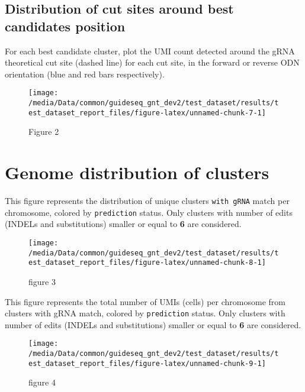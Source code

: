 \documentclass[
]{article}
\begin{document}
\subsection{Distribution of cut sites around best candidates
position}\label{distribution-of-cut-sites-around-best-candidates-position}

For each best candidate cluster, plot the UMI count detected around the
gRNA theoretical cut site (dashed line) for each cut site, in the
forward or reverse ODN orientation (blue and red bars respectively).

\begin{figure}[H]

{\centering \texttt{[image: /media/Data/common/guideseq\_gnt\_dev2/test\_dataset/results/test\_dataset\_report\_files/figure-latex/unnamed-chunk-7-1]} 

}

\caption{Figure 2}\label{fig:unnamed-chunk-7}
\end{figure}

\section{Genome distribution of
clusters}\label{genome-distribution-of-clusters}

This figure represents the distribution of unique clusters
\texttt{with\ gRNA} match per chromosome, colored by \texttt{prediction}
status. Only clusters with number of edits (INDELs and substitutions)
smaller or equal to \textbf{6} are considered.

\begin{figure}[H]

{\centering \texttt{[image: /media/Data/common/guideseq\_gnt\_dev2/test\_dataset/results/test\_dataset\_report\_files/figure-latex/unnamed-chunk-8-1]} 

}

\caption{figure 3}\label{fig:unnamed-chunk-8}
\end{figure}

This figure represents the total number of UMIs (cells) per chromosome
from clusters with gRNA match, colored by \texttt{prediction} status.
Only clusters with number of edits (INDELs and substitutions) smaller or
equal to \textbf{6} are considered.

\begin{figure}[H]

{\centering \texttt{[image: /media/Data/common/guideseq\_gnt\_dev2/test\_dataset/results/test\_dataset\_report\_files/figure-latex/unnamed-chunk-9-1]} 

}

\caption{figure 4}\label{fig:unnamed-chunk-9}
\end{figure}
\end{document}
